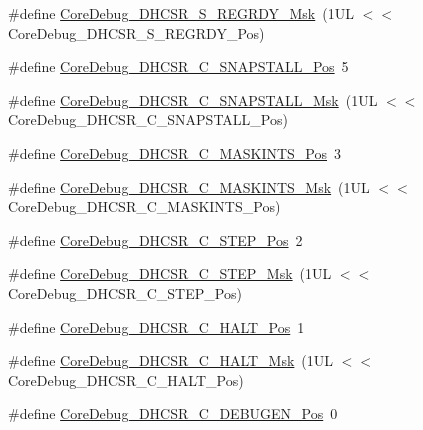\begin{DoxyCompactItemize}
\item 
\#define \hyperlink{group___c_m_s_i_s___core_debug_gac4cd6f3178de48f473d8903e8c847c07}{Core\+Debug\+\_\+\+D\+H\+C\+S\+R\+\_\+\+S\+\_\+\+R\+E\+G\+R\+D\+Y\+\_\+\+Msk}~(1\+U\+L $<$$<$ Core\+Debug\+\_\+\+D\+H\+C\+S\+R\+\_\+\+S\+\_\+\+R\+E\+G\+R\+D\+Y\+\_\+\+Pos)
\item 
\#define \hyperlink{group___c_m_s_i_s___core_debug_ga85747214e2656df6b05ec72e4d22bd6d}{Core\+Debug\+\_\+\+D\+H\+C\+S\+R\+\_\+\+C\+\_\+\+S\+N\+A\+P\+S\+T\+A\+L\+L\+\_\+\+Pos}~5
\item 
\#define \hyperlink{group___c_m_s_i_s___core_debug_ga53aa99b2e39a67622f3b9973e079c2b4}{Core\+Debug\+\_\+\+D\+H\+C\+S\+R\+\_\+\+C\+\_\+\+S\+N\+A\+P\+S\+T\+A\+L\+L\+\_\+\+Msk}~(1\+U\+L $<$$<$ Core\+Debug\+\_\+\+D\+H\+C\+S\+R\+\_\+\+C\+\_\+\+S\+N\+A\+P\+S\+T\+A\+L\+L\+\_\+\+Pos)
\item 
\#define \hyperlink{group___c_m_s_i_s___core_debug_ga0d2907400eb948a4ea3886ca083ec8e3}{Core\+Debug\+\_\+\+D\+H\+C\+S\+R\+\_\+\+C\+\_\+\+M\+A\+S\+K\+I\+N\+T\+S\+\_\+\+Pos}~3
\item 
\#define \hyperlink{group___c_m_s_i_s___core_debug_ga77fe1ef3c4a729c1c82fb62a94a51c31}{Core\+Debug\+\_\+\+D\+H\+C\+S\+R\+\_\+\+C\+\_\+\+M\+A\+S\+K\+I\+N\+T\+S\+\_\+\+Msk}~(1\+U\+L $<$$<$ Core\+Debug\+\_\+\+D\+H\+C\+S\+R\+\_\+\+C\+\_\+\+M\+A\+S\+K\+I\+N\+T\+S\+\_\+\+Pos)
\item 
\#define \hyperlink{group___c_m_s_i_s___core_debug_gae1fc39e80de54c0339cbb1b298a9f0f9}{Core\+Debug\+\_\+\+D\+H\+C\+S\+R\+\_\+\+C\+\_\+\+S\+T\+E\+P\+\_\+\+Pos}~2
\item 
\#define \hyperlink{group___c_m_s_i_s___core_debug_gae6bda72fbd32cc5734ff3542170dc00d}{Core\+Debug\+\_\+\+D\+H\+C\+S\+R\+\_\+\+C\+\_\+\+S\+T\+E\+P\+\_\+\+Msk}~(1\+U\+L $<$$<$ Core\+Debug\+\_\+\+D\+H\+C\+S\+R\+\_\+\+C\+\_\+\+S\+T\+E\+P\+\_\+\+Pos)
\item 
\#define \hyperlink{group___c_m_s_i_s___core_debug_gaddf1d43f8857e4efc3dc4e6b15509692}{Core\+Debug\+\_\+\+D\+H\+C\+S\+R\+\_\+\+C\+\_\+\+H\+A\+L\+T\+\_\+\+Pos}~1
\item 
\#define \hyperlink{group___c_m_s_i_s___core_debug_ga1d905a3aa594eb2e8bb78bcc4da05b3f}{Core\+Debug\+\_\+\+D\+H\+C\+S\+R\+\_\+\+C\+\_\+\+H\+A\+L\+T\+\_\+\+Msk}~(1\+U\+L $<$$<$ Core\+Debug\+\_\+\+D\+H\+C\+S\+R\+\_\+\+C\+\_\+\+H\+A\+L\+T\+\_\+\+Pos)
\item 
\#define \hyperlink{group___c_m_s_i_s___core_debug_gab557abb5b172b74d2cf44efb9d824e4e}{Core\+Debug\+\_\+\+D\+H\+C\+S\+R\+\_\+\+C\+\_\+\+D\+E\+B\+U\+G\+E\+N\+\_\+\+Pos}~0
$$
\end{DoxyCompactItemize}
